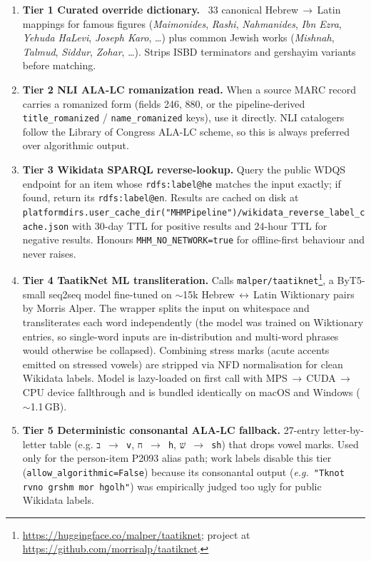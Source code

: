 \documentclass[12pt]{article}
\newcommand{\code}[1]{\texttt{#1}}
\begin{document}
\begin{enumerate}
\item \textbf{Tier 1 \textemdash{} Curated override dictionary.} ~33
canonical Hebrew\,$\to$\,Latin mappings for famous figures
(\textit{Maimonides}, \textit{Rashi}, \textit{Nahmanides},
\textit{Ibn Ezra}, \textit{Yehuda HaLevi}, \textit{Joseph Karo}, …)
plus common Jewish works (\textit{Mishnah}, \textit{Talmud},
\textit{Siddur}, \textit{Zohar}, …). Strips ISBD terminators and
gershayim variants before matching.

\item \textbf{Tier 2 \textemdash{} NLI ALA-LC romanization read.}
When a source MARC record carries a romanized form (fields 246, 880, or
the pipeline-derived \code{title\_romanized} / \code{name\_romanized}
keys), use it directly. NLI catalogers follow the Library of Congress
ALA-LC scheme, so this is always preferred over algorithmic output.

\item \textbf{Tier 3 \textemdash{} Wikidata SPARQL reverse-lookup.}
Query the public WDQS endpoint for an item whose \code{rdfs:label@he}
matches the input exactly; if found, return its \code{rdfs:label@en}.
Results are cached on disk at
\code{platformdirs.user\_cache\_dir("MHMPipeline")/wikidata\_reverse\_label\_cache.json}
with 30-day TTL for positive results and 24-hour TTL for negative
results. Honours \code{MHM\_NO\_NETWORK=true} for offline-first
behaviour and never raises.

\item \textbf{Tier 4 \textemdash{} TaatikNet ML transliteration.}
Calls \code{malper/taatiknet}\footnote{\url{https://huggingface.co/malper/taatiknet}; project at \url{https://github.com/morrisalp/taatiknet}.}, a ByT5-small seq2seq model fine-tuned on $\sim$15k Hebrew\,$\leftrightarrow$\,Latin Wiktionary pairs by Morris Alper. The wrapper splits the input on
whitespace and transliterates each word independently (the model was
trained on Wiktionary entries, so single-word inputs are
in-distribution and multi-word phrases would otherwise be collapsed).
Combining stress marks (acute accents emitted on stressed vowels) are
stripped via NFD normalisation for clean Wikidata labels. Model is
lazy-loaded on first call with MPS\,$\to$\,CUDA\,$\to$\,CPU device
fallthrough and is bundled identically on macOS and Windows
($\sim$1.1\,GB).

\item \textbf{Tier 5 \textemdash{} Deterministic consonantal ALA-LC
fallback.} 27-entry letter-by-letter table (e.g. \code{ב\,$\to$\,v},
\code{ח\,$\to$\,h}, \code{שׁ\,$\to$\,sh}) that drops vowel marks. Used
only for the person-item P2093 alias path; work labels disable this
tier (\code{allow\_algorithmic=False}) because its consonantal output
(\textit{e.g.}~\code{"Tknot rvno grshm mor hgolh"}) was empirically
judged too ugly for public Wikidata labels.
\end{enumerate}
\end{document}

